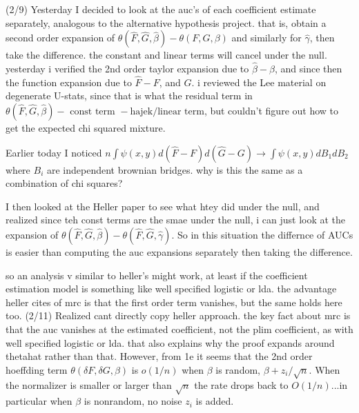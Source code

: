 \documentclass{article}
\begin{document}
(2/9) Yesterday I decided to look at the auc's of each coefficient
estimate separately, analogous to the alternative hypothesis
project. that is, obtain a second order expansion of
$\theta(\hat F, \hat G, \hat \beta) - \theta(F,G,\beta)$ and similarly
for $\hat\gamma$, then take the difference. the constant and linear
terms will cancel under the null. yesterday i verified the 2nd order
taylor expansion due to $\hat\beta - \beta$, and since then the
function expansion due to $\hat F - F$, and $G$. i reviewed the Lee
material on degenerate U-stats, since that is what the residual term
in
$\theta(\hat F, \hat G, \hat\beta) - \text{ const term } - \text{
  hajek/linear term}$, but couldn't figure out how to get the expected chi squared mixture.

Earlier today I noticed $n\int \psi(x,y) d(\hat F - F)d(\hat G - G) \to \int \psi(x,y) dB_1dB_2$ where $B_i$ are independent brownian bridges. why is this the same as a combination of chi squares?

I then looked at the Heller paper to see what htey did under the null,
and realized since teh const terms are the smae under the null, i can
just look at the expansion of
$\theta(\hat F,\hat G,\hat\beta) - \theta(\hat F,\hat G,\hat\gamma)
$. So in this situation the differnce of AUCs is easier than computing
the auc expansions separately then taking the difference.

so an analysis v similar to heller's might work, at least if the
coefficient estimation model is something like well specified logistic
or lda. the advantage heller cites of mrc is that the first order term
vanishes, but the same holds here too.  (2/11) Realized cant directly
copy heller approach. the key fact about mrc is that the auc vanishes
at the estimated coefficient, not the plim coefficient, as with well
specified logistic or lda. that also explains why the proof expands
around thetahat rather than that. However, from 1e it seems that the
2nd order hoeffding term $\theta(\delta F,\delta G,\beta)$ is
$o(1/n)$ when $\beta$ is random, $\beta+z_i/\sqrt{n}$. When the
normalizer is smaller or larger than $\sqrt{n}$ the rate drops back to
$O(1/n)$...in particular when $\beta$ is nonrandom, no noise $z_i$ is
added.
\end{document}
